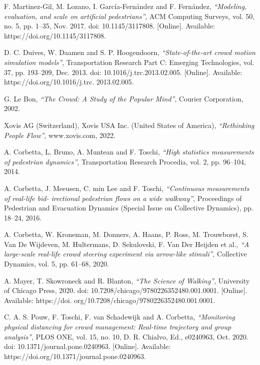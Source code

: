 \documentclass{standalone}
\begin{document}
\begin{thebibliography}{99}






F. Martinez-Gil, M. Lozano, I. García-Fernández and F. Fernández,
  \textit{“Modeling, evaluation, and scale on artificial pedestrians”},
ACM Computing Surveys,
 vol. 50, no. 5, pp. 1–35, 
 Nov. 2017. 
 doi: 10.1145/3117808. 
 [Online]. Available: https://doi.org/10.1145/3117808.

D. C. Duives, W. Daamen and S. P. Hoogendoorn,
  \textit{“State-of-the-art crowd motion simulation models”},
Transportation Research Part C: Emerging Technologies,
 vol. 37, pp. 193–209, 
 Dec. 2013. 
 doi: 10.1016/j.trc.2013.02.005.
 [Online]. Available: https://doi.org/10.1016/j.trc. 2013.02.005.

G. Le Bon,
  \textit{“The Crowd: A Study of the Popular Mind”},
Courier Corporation, 
2002.

Xovis AG (Switzerland), Xovis USA Inc. (United States of America),
  \textit{“Rethinking People Flow”},
www.xovis.com,
2022.

A. Corbetta, L. Bruno, A. Muntean and F. Toschi,
  \textit{“High statistics measurements of pedestrian dynamics”},
Transportation Research Procedia,
vol. 2, 
pp. 96–104, 
2014.

A. Corbetta, J. Meeusen, C. min Lee and F. Toschi,
  \textit{“Continuous measurements of real-life bid- irectional pedestrian flows on a wide walkway”},
Proceedings of Pedestrian and Evacuation Dynamics (Special Issue on Collective Dynamics), 
pp. 18–24, 
2016.

A. Corbetta, W. Kroneman, M. Donners, A. Haans, P. Ross, M. Trouwborst, S. Van De Wijdeven, M. Hultermans, D. Sekulovski, F. Van Der Heijden et al.,
  \textit{“A large-scale real-life crowd steering experiment via arrow-like stimuli”},
Collective Dynamics, 
vol. 5, pp. 61–68, 
2020.

A. Mayer, T. Skowroneck and R. Blanton,
  \textit{“The Science of Walking”},
University of Chicago Press, 
2020. 
doi: 10.7208/chicago/9780226352480.001.0001. 
[Online]. Available: https://doi. org/10.7208/chicago/9780226352480.001.0001.

C. A. S. Pouw, F. Toschi, F. van Schadewijk and A. Corbetta, 
  \textit{“Monitoring physical distancing for crowd management: Real-time trajectory and group analysis”}, 
  PLOS ONE, vol. 15, no. 10, D. R. Chialvo, 
  Ed., e0240963, 
  Oct. 2020. 
  doi: 10.1371/journal.pone.0240963. 
  [Online]. Available: https://doi.org/10.1371/journal.pone.0240963.


\end{thebibliography}
\end{document}
